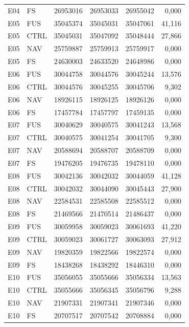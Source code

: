 \begin{singlespace}
\begin{longtable}{@{}llrrrr@{}}
E04 & FS & 26953016 & 26953033 & 26955042 & 0{,}000\\
E05 & FUS & 35045374 & 35045031 & 35047061 & 41{,}116\\
E05 & CTRL & 35045031 & 35047092 & 35048444 & 27{,}866\\
E05 & NAV & 25759887 & 25759913 & 25759917 & 0{,}000\\
E05 & FS & 24630003 & 24633520 & 24648986 & 0{,}000\\
E06 & FUS & 30044758 & 30044576 & 30045244 & 13{,}576\\
E06 & CTRL & 30044576 & 30045255 & 30045706 & 9{,}302\\
E06 & NAV & 18926115 & 18926125 & 18926126 & 0{,}000\\
E06 & FS & 17457784 & 17457797 & 17459135 & 0{,}000\\
E07 & FUS & 30040629 & 30040575 & 30041243 & 13{,}568\\
E07 & CTRL & 30040575 & 30041254 & 30041705 & 9{,}300\\
E07 & NAV & 20588694 & 20588707 & 20588709 & 0{,}000\\
E07 & FS & 19476205 & 19476735 & 19478110 & 0{,}000\\
E08 & FUS & 30042136 & 30042032 & 30044059 & 41{,}128\\
E08 & CTRL & 30042032 & 30044090 & 30045443 & 27{,}900\\
E08 & NAV & 22584531 & 22585508 & 22585512 & 0{,}000\\
E08 & FS & 21469566 & 21470514 & 21486437 & 0{,}000\\
E09 & FUS & 30059958 & 30059023 & 30061693 & 41{,}220\\
E09 & CTRL & 30059023 & 30061727 & 30063093 & 27{,}912\\
E09 & NAV & 19820359 & 19822566 & 19822574 & 0{,}000\\
E09 & FS & 18438268 & 18438292 & 18446310 & 0{,}000\\
E10 & FUS & 35056055 & 35055666 & 35056334 & 13{,}563\\
E10 & CTRL & 35055666 & 35056345 & 35056796 & 9{,}288\\
E10 & NAV & 21907331 & 21907341 & 21907346 & 0{,}000\\
E10 & FS & 20707517 & 20707542 & 20708884 & 0{,}000\\
\end{longtable}
\endgroup
{}
\end{singlespace}
